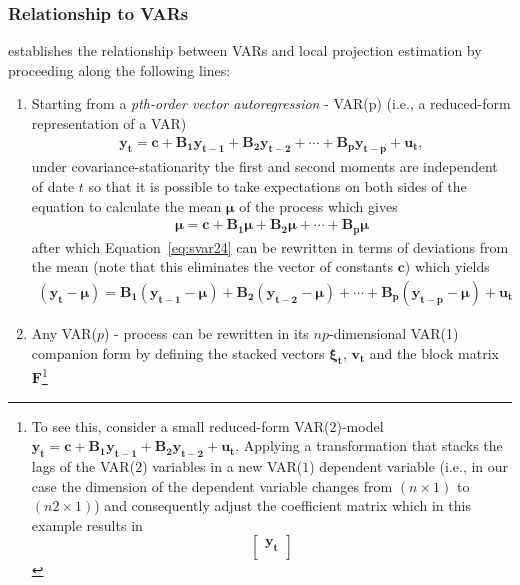 \documentclass[a4paper,11pt,listof=nochaptergap,oneside,pointednumbers,bibtotoc,bigheadings,liststotoc]{scrbook}
\theoremstyle{mysatz}
\theoremstyle{mydefinition}
\theoremstyle{mybemerkung}
\renewcommand*{\paragraph}[1]{\subsubsection*{#1} \vspace{-3mm}} %
\newcommand{\vect}[1]{\boldsymbol{\mathbf{#1}}}
\begin{document}
\paragraph{Relationship to VARs}
\citet{jorda:05} establishes the relationship between VARs and local projection estimation by proceeding along the following lines:
\begin{enumerate}
	\item Starting from a \textit{pth-order vector autoregression} - VAR(p) (i.e., a reduced-form representation of a VAR)
	\begin{equation} \label{eq:svar24}
	\begin{split}
		\vect{y_t} = \vect{c} + \vect{B_1}\vect{y_{t-1}} + \vect{B_2}\vect{y_{t-2}} + \cdots + \vect{B_p}\vect{y_{t-p}} + \vect{u_t},
	\end{split}								
	\end{equation}	
	under covariance-stationarity the first and second moments are independent of date $t$ so that it is possible to take expectations on both sides of the equation to calculate the mean $\vect{\mu}$ of the process which gives
	\begin{equation} \label{eq:svar25}
	\begin{split}
		\vect{\mu} = \vect{c} + \vect{B_1}\vect{\mu} + \vect{B_2}\vect{\mu}+\cdots + \vect{B_p}\vect{\mu}
	\end{split}								
	\end{equation}	
	after which Equation~\ref{eq:svar24} can be rewritten in terms of deviations from the mean (note that this eliminates the vector of constants $\vect{c}$) which yields
	\begin{equation} \label{eq:svar26}
	\begin{split}
		(\vect{y_t} - \vect{\mu}) = \vect{B_1}(\vect{y_{t-1}} - \vect{\mu}) + \vect{B_2}(\vect{y_{t-2}} - \vect{\mu}) + \cdots + \vect{B_p}(\vect{y_{t-p}} - \vect{\mu}) + \vect{u_t}
	\end{split}								
	\end{equation}	
	\item Any VAR($p$) - process can be rewritten in its $np$-dimensional VAR(1) companion form by defining the stacked vectors $\vect{\xi_t}$, $\vect{v_t}$ and the block matrix $\vect{F}$\footnote{To see this, consider a small reduced-form VAR($2$)-model $\vect{y_t} = \vect{c} + \vect{B_1}\vect{y_{t-1}} + \vect{B_2}\vect{y_{t-2}} + \vect{u_t}$. Applying a transformation that stacks the lags of the VAR($2$) variables in a new VAR($1$) dependent variable (i.e., in our case the dimension of the dependent variable changes from $(n \times 1)$ to $(n2 \times 1)$) and consequently adjust the coefficient matrix which in this example results in $$\begin{bmatrix} \vect{y_t}\\

\end{bmatrix}$$}
\end{enumerate}
\end{document}
